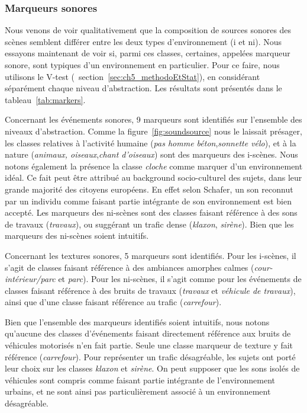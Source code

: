 \subsubsection{Marqueurs sonores}

Nous venons de voir qualitativement que la composition de sources sonores des scènes semblent différer entre les deux types d'environnement (i et ni). Nous essayons maintenant de voir si, parmi ces classes, certaines, appelées marqueur sonore, sont typiques d'un environnement en particulier. Pour ce faire, nous utilisons le V-test (\cf~section~\ref{sec:ch5_methodoEtStat}), en considérant séparément chaque niveau d'abstraction. Les résultats sont présentés dans le tableau~\ref{tab:markers}.

Concernant les événements sonores, 9 marqueurs sont identifiés sur l'ensemble des niveaux d'abstraction. Comme la figure~\ref{fig:soundsource} nous le laissait présager, les classes relatives à l'activité humaine (\emph{pas homme béton},\emph{sonnette vélo}), et à la nature (\emph{animaux, oiseaux},\emph{chant d'oiseaux}) sont des marqueurs des i-scènes. Nous notons également la présence la classe \emph{cloche} comme marquer d'un environnement idéal. Ce fait peut être attribué au background socio-culturel des sujets, dans leur grande majorité des citoyens européens. En effet selon Schafer, un son reconnut par un individu comme faisant partie intégrante de son environnement est bien accepté. Les marqueurs des ni-scènes sont des classes faisant référence à des sons de travaux (\emph{travaux}), ou suggérant un trafic dense (\emph{klaxon}, \emph{sirène}). Bien que les marqueurs des ni-scènes soient intuitifs. 

Concernant les textures sonores, 5 marqueurs sont identifiés. Pour les i-scènes, il s'agit de classes faisant référence à des ambiances amorphes calmes (\emph{cour-intérieur/parc} et \emph{parc}). Pour les ni-scènes, il s'agit comme pour les événements de classes faisant référence à des bruits de travaux (\emph{travaux} et \emph{véhicule de travaux}), ainsi que d'une classe faisant référence au trafic (\emph{carrefour}).


Bien que l'ensemble des marqueurs identifiés soient intuitifs, nous notons qu'aucune des classes d'événements faisant directement référence aux bruits de véhicules motorisés n'en fait partie. Seule une classe marqueur de texture y fait référence (\emph{carrefour}). Pour représenter un trafic désagréable, les sujets ont porté leur choix sur les classes \emph{klaxon} et \emph{sirène}. On peut supposer que les sons isolés de véhicules sont compris comme faisant partie intégrante de l'environnement urbains, et ne sont ainsi pas particulièrement associé à un environnement désagréable. \\ 

